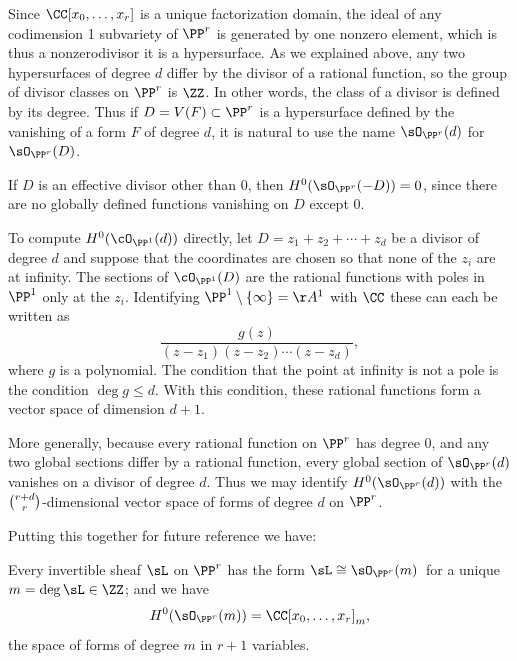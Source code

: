\begin{example} \label{linear series on Pr} Since $\CC[x_0,\dots,x_r]$ is a
unique factorization domain, the ideal of any codimension 1 subvariety of $\PP^r$ is generated by one
nonzero element, which is thus a nonzerodivisor \emdash it is a hypersurface.  As we explained above,
any two hypersurfaces of degree $d$ differ by the divisor of a rational function, so
the group of divisor classes on $\PP^r$ is $\ZZ$.
In other words,
the class of a divisor is defined by its degree.
Thus if $D = V(F)\subset \PP^{r}$ is a hypersurface defined by the vanishing of a  form
$F$ of degree $d$,
it is natural to use the name
$\sO_{\PP^r}(d)$
%
  for $\sO_{\PP^r}(D)$.

If $D$ is an effective divisor other than 0, then $H^{0}(\sO_{\PP^{r}}(-D)) = 0$, since there are
no globally defined functions vanishing on $D$ except 0.

To compute $H^0(\cO_{\PP^1} (d))$ directly, let $D = z_1 +z_2
+\cdots+z_d$ be a divisor of degree
$d$
and suppose that the coordinates are chosen so that none of the $z_i$ are at infinity. The sections of $\cO_{\PP^1} (D)$ are the rational functions with poles in $\PP^1$ only at
the $z_i$. Identifying $\PP^1\setminus \{\infty\} = \AA^1$ with $\CC$ these can each be written as
$$
\frac{g(z)}{(z-z_1)(z-z_2)\cdots(z-z_d)}
,
$$
where $g$ is a polynomial. The condition that the point at infinity is
not a pole is the condition $\deg g \leq d$. With this condition,
these rational functions form a vector space of dimension $d+1$.

More generally, because every
rational function on $\PP^{r}$ has degree 0, and any two global sections differ by a rational
function,
every global section of $\sO_{\PP^{r}}(d)$ vanishes on a divisor of degree $d$. Thus
we may identify $H^{0}(\sO_{\PP^{r}}(d))$ with the $\tbinom{r+d}{r}$-dimensional vector space of forms of degree $d$ on $\PP^{r}$.

Putting this together for future reference we have:
%

\begin{proposition}
Every invertible sheaf $\sL$ on $\PP^r$ has the form $\sL \cong\sO_{\PP^r}(m)$
\,for a unique $m = \deg \sL \in \ZZ$; and we have
 $$
 H^0(\sO_{\PP^r}(m)) =
\CC[x_0,\dots, x_r]_m
,
 $$
 the space of forms of degree $m$ in $r+1$ variables.
\end{proposition}
\end{example}

